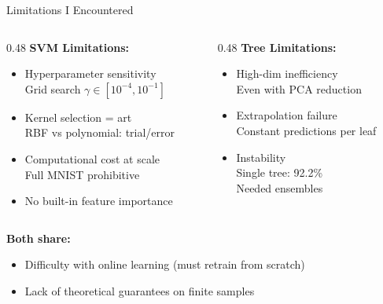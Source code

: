 \documentclass[aspectratio=169]{beamer}
\begin{document}
\begin{frame}{Limitations I Encountered}

\begin{columns}[T]
\begin{column}{0.48\textwidth}
\textbf{SVM Limitations:}
\begin{itemize}
\item Hyperparameter sensitivity\\
\small{Grid search $\gamma \in [10^{-4}, 10^{-1}]$}
\item Kernel selection = art\\
\small{RBF vs polynomial: trial/error}
\item Computational cost at scale\\
\small{Full MNIST prohibitive}
\item No built-in feature importance
\end{itemize}
\end{column}

\begin{column}{0.48\textwidth}
\textbf{Tree Limitations:}
\begin{itemize}
\item High-dim inefficiency\\
\small{Even with PCA reduction}
\item Extrapolation failure\\
\small{Constant predictions per leaf}
\item Instability\\
\small{Single tree: 92.2\%}\\
\small{Needed ensembles}
\end{itemize}
\end{column}
\end{columns}

\vspace{0.5cm}
\textbf{Both share:}
\begin{itemize}
\item Difficulty with online learning (must retrain from scratch)
\item Lack of theoretical guarantees on finite samples
\end{itemize}

\end{frame}
\end{document}
